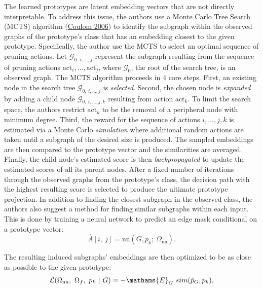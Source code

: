 \documentclass[
  11pt,
  letterpaper,
]{article}
\begin{document}
\quad The learned prototypes are latent embedding vectors that are not
directly interpretable. To address this issue, the authors use a Monte
Carlo Tree Search (MCTS) algorithm
(\protect\hyperlink{ref-Coulom2006EfficientSA}{Coulom 2006}) to identify
the subgraph within the observed graphs of the prototype's class that
has an embedding closest to the given prototype. Specifically, the
author use the MCTS to select an optimal sequence of pruning actions.
Let \(\mathcal{G}_{0, \ i, \dots, j}\) represent the subgraph resulting
from the sequence of pruning actions
\(\text{act}_i,\dots, \text{act}_j\), where \(\mathcal{G}_0\), the root
of the search tree, is an observed graph. The MCTS algorithm proceeds in
4 core steps. First, an existing node in the search tree
\(\mathcal{G}_{0, \ i, \dots, j}\) is \emph{selected}. Second, the
chosen node is \emph{expanded} by adding a child node
\(\mathcal{G}_{0, \ i, \dots, j, k}\) resulting from action
\(\text{act}_k\). To limit the search space, the authors restrict
\(\text{act}_k\) to be the removal of a peripheral node with minimum
degree. Third, the reward for the sequence of actions \(i, \dots, j, k\)
is estimated via a Monte Carlo \emph{simulation} where additional random
actions are taken until a subgraph of the desired size is produced. The
sampled embeddings are then compared to the prototype vector and the
similarities are averaged. Finally, the child node's estimated score is
then \emph{backpropagated} to update the estimated scores of all its
parent nodes. After a fixed number of iterations through the observed
graphs from the prototype's class, the decision path with the highest
resulting score is selected to produce the ultimate prototype
projection. In addition to finding the closest subgraph in the observed
class, the authors also suggest a method for finding similar subgraphs
within each input. This is done by training a neural network to predict
an edge mask conditional on a prototype vector:\\
\begin{equation}
        \hat A[i, \ j] = \text{nn}\left(G, p_k; \ \Omega_{\text{nn}}\right).  
    \end{equation}

The resulting induced subgraphs' embeddings are then optimized to be as
close as possible to the given prototype: \begin{equation}
        \mathcal{L}(\Omega_{\text{nn}}, \ \Omega_f, \ p_k \ | \ G) = -\mathams{E}_G \ sim(\hat p_G, p_k), 
    \end{equation}
\end{document}

